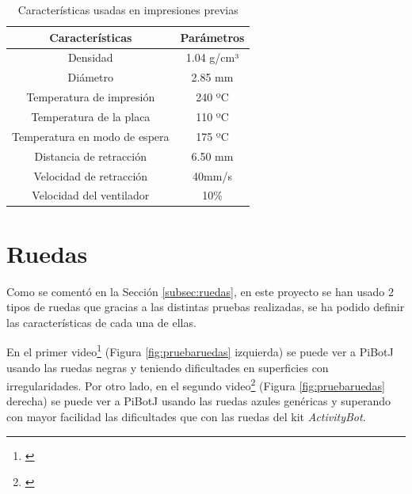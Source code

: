 \begin{table}[H]
	\begin{center}
		\begin{tabular}{|c|c|}
			\hline
			Características & Parámetros\\
			\hline
			 Densidad & 1.04 g/cm³\\
			\hline
			Diámetro & 2.85 mm\\
			\hline
			Temperatura de impresión & 240 ºC\\
			\hline
			Temperatura de la placa & 110 ºC\\
			\hline
			Temperatura en modo de espera & 175 ºC\\
			\hline
			Distancia de retracción & 6.50 mm\\
			\hline
			Velocidad de retracción & 40mm/s\\
			\hline
			Velocidad del ventilador & 10\%\\
			\hline
		\end{tabular}
		\caption{Características usadas en impresiones previas}
		\label{cuadro:cimpresion2}
	\end{center}
\end{table}

\section{Ruedas}
\label{sec:expruedas}
Como se comentó en la Sección \ref{subsec:ruedas}, en este proyecto se han usado 2 tipos de ruedas que gracias a las distintas pruebas realizadas, se ha podido definir las características de cada una de ellas. 

En el primer video\footnote{\url{}} (Figura \ref{fig:pruebaruedas} izquierda) se puede ver a PiBotJ usando las ruedas negras y teniendo dificultades en superficies con irregularidades. Por otro lado, en el segundo video\footnote{\url{}} (Figura \ref{fig:pruebaruedas} derecha) se puede ver a PiBotJ usando las ruedas azules genéricas y superando con mayor facilidad las dificultades que con las ruedas del kit \textit{ActivityBot}.




